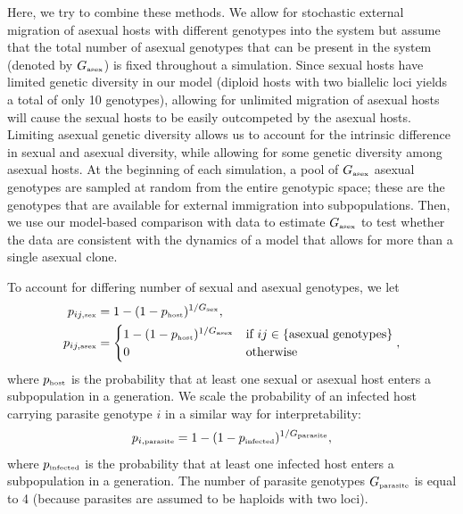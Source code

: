 \documentclass{article}\usepackage[]{graphicx}\usepackage[]{color}
\begin{document}
Here, we try to combine these methods.
We allow for stochastic external migration of asexual hosts with different
genotypes into the system but assume that the total number of asexual genotypes 
that can be present in the system (denoted by $G_{\textrm{\tiny asex}}$) is fixed
throughout a simulation. 
Since sexual hosts have limited genetic diversity in our model (diploid hosts 
with two biallelic loci yields a total of only 10 genotypes), allowing for 
unlimited migration of asexual hosts will cause the sexual hosts to be 
easily outcompeted by the asexual hosts. Limiting asexual genetic diversity 
allows us to account for the intrinsic difference in sexual and asexual diversity,
while allowing for some genetic diversity among asexual hosts.
At the beginning of each simulation, a pool of $G_{\textrm{\tiny asex}}$ asexual 
genotypes are sampled at random from the entire genotypic space; these are the 
genotypes that are available for external immigration into subpopulations.
Then, we use our model-based comparison with data to estimate $G_{\textrm{\tiny asex}}$
to test whether the data are consistent with the dynamics of a model that allows 
for more than a single asexual clone.

To account for differing number of sexual and asexual genotypes, we let 
\begin{equation}
\begin{aligned}
p_{ij, \textrm{\tiny sex}} &= 1-(1-p_{\textrm{\tiny host}})^{1/G_\textrm{\tiny sex}},\\
p_{ij, \textrm{\tiny asex}} &=
\begin{cases}
1-(1-p_{\textrm{\tiny host}})^{1/G_\textrm{\tiny asex}} & \text{if } ij \in \{\text{asexual genotypes}\} \\
0 & \text{otherwise}
\end{cases},
\end{aligned}
\end{equation}
where $p_{\textrm{\tiny host}}$ is the probability that at least one sexual or asexual host enters a subpopulation in a generation. We scale the probability of an infected host carrying parasite genotype $i$ in a similar way for interpretability:
\begin{equation}
p_{i, \textrm{\tiny parasite}} = 1 - (1-p_{\textrm{\tiny infected}})^{1/G_\textrm{\tiny parasite}},
\end{equation}
where $p_{\textrm{\tiny infected}}$ is the probability that at least one infected host enters a subpopulation in a generation.
The number of parasite genotypes $G_\textrm{\tiny parasite}$ is equal to 4 (because parasites are assumed to be haploids with two loci).
\end{document}
